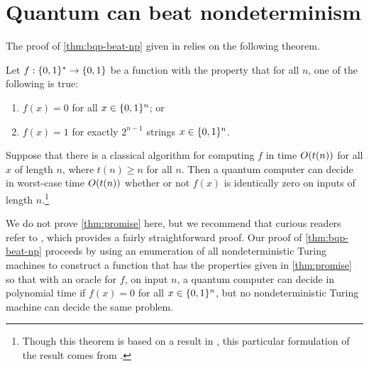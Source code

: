 \documentclass[12pt]{article}
\begin{document}
\section{Quantum can beat nondeterminism \cite{BB92a}}

The proof of \cref{thm:bqp-beat-np} given in \cite{BB92a} relies on the following
theorem.

\begin{thm}[\cite{DJ92}]
  \label{thm:promise}
  Let $f : \{0,1\}^* \to \{0,1\}$ be a function with the property that for all $n$, one
  of the following is true:
  \begin{enumerate}[label=(\arabic*)]
    \item $f(x) = 0$ for all $x \in \{0,1\}^n$; or
    \item $f(x) = 1$ for exactly $2^{n-1}$ strings $x \in \{0,1\}^n$.
  \end{enumerate}
  Suppose that there is a classical algorithm for computing $f$ in time
  $\bigo{t(n)}$ for all $x$ of length $n$, where $t(n) \ge n$ for all $n$. Then
  a quantum computer can decide in worst-case time $\bigo{t(n)}$ whether or not
  $f(x)$ is identically zero on inputs of length $n$.\footnote{Though this
  theorem is based on a result in \cite{DJ92}, this particular formulation of
  the result comes from \cite{BB92b}.}
\end{thm}

We do not prove \cref{thm:promise} here, but we recommend that curious readers
refer to \cite{DJ92}, which provides a fairly straightforward proof. Our proof
of \cref{thm:bqp-beat-np} proceeds by using an enumeration of all
nondeterministic Turing machines to construct a function that has the properties
given in \cref{thm:promise} so that with an oracle for $f$, on input $n$, a
quantum computer can decide in polynomial time if $f(x)=0$ for all $x\in \{0,1\}^n$,
but no nondeterministic Turing machine can decide the same problem. 
\end{document}
